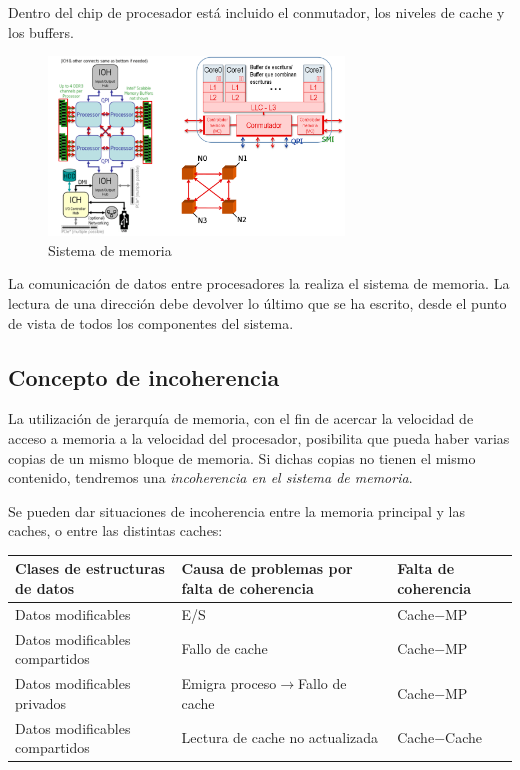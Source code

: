 \documentclass[10pt,a4paper,spanish]{report}
\begin{document}
Dentro del chip de procesador está incluido el conmutador, los niveles de cache y los buffers.

\begin{figure}[!h]
\centering
\includegraphics[width=0.7\textwidth]{67}
\caption{Sistema de memoria}
\label{sis_mem}
\end{figure}

La comunicación de datos entre procesadores la realiza el sistema de memoria. La lectura de una dirección debe devolver lo último que se ha escrito, desde el punto de vista de todos los componentes del sistema.

\textcolor[rgb]{0.2,0.4,0.8}{\subsection{Concepto de incoherencia}}
La utilización de jerarquía de memoria, con el fin de acercar la velocidad de acceso a memoria a la velocidad del procesador, posibilita que pueda haber varias copias de un mismo bloque de memoria. Si dichas copias no tienen el mismo contenido, tendremos una \textcolor[rgb]{0.2,0.4,0.8}{\textit{incoherencia en el sistema de memoria}}.

Se pueden dar situaciones de incoherencia entre la memoria principal y las caches, o entre las distintas caches:

\begin{tabular}{|p{5cm}|p{6.5cm}|p{3.5cm}|}
\hline
\textbf{Clases de estructuras de datos} & \textbf{Causa de problemas por falta de coherencia} & \textbf{Falta de coherencia} \\
\hline
Datos modificables & E/S & Cache$-$MP \\
\hline
Datos modificables compartidos & Fallo de cache & Cache$-$MP \\
\hline
Datos modificables privados & Emigra proceso$\rightarrow$Fallo de cache & Cache$-$MP \\
\hline
Datos modificables compartidos & Lectura de cache no actualizada & Cache$-$Cache\\
\hline
\end{tabular}
\end{document}
